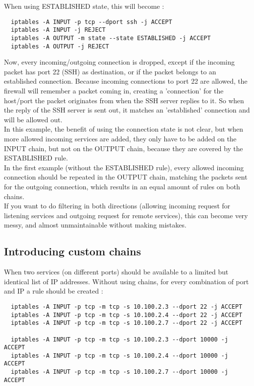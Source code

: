 \documentclass[a4paper,12pt]{article}
\begin{document}
When using ESTABLISHED state, this will become :
\begin{verbatim}
  iptables -A INPUT -p tcp --dport ssh -j ACCEPT
  iptables -A INPUT -j REJECT
  iptables -A OUTPUT -m state --state ESTABLISHED -j ACCEPT
  iptables -A OUTPUT -j REJECT
\end{verbatim}

Now, every incoming/outgoing connection is dropped, except if the incoming packet has port 22 (SSH) as destination, or if the packet belongs to an established connection. Because incoming connections to port 22 are allowed, the firewall will remember a packet coming in, creating a 'connection' for the host/port the packet originates from when the SSH server replies to it. So when the reply of the SSH server is sent out, it matches an 'established' connection and will be allowed out.\\

In this example, the benefit of using the connection state is not clear, but when more allowed incoming services are added, they only have to be added on the INPUT chain, but not on the OUTPUT chain, because they are covered by the ESTABLISHED rule.\\
In the first example (without the ESTABLISHED rule), every allowed incoming connection should be repeated in the OUTPUT chain, matching the packets sent for the outgoing connection, which results in an equal amount of rules on both chains.\\
If you want to do filtering in both directions (allowing incoming request for listening services and outgoing request for remote services), this can become very messy, and almost unmaintainable without making mistakes.\\

\subsection{Introducing custom chains}
When two services (on different ports) should be available to a limited but identical list of IP addresses.
Without using chains, for every combination of port and IP a rule should be created :
\begin{verbatim}
  iptables -A INPUT -p tcp -m tcp -s 10.100.2.3 --dport 22 -j ACCEPT
  iptables -A INPUT -p tcp -m tcp -s 10.100.2.4 --dport 22 -j ACCEPT
  iptables -A INPUT -p tcp -m tcp -s 10.100.2.7 --dport 22 -j ACCEPT

  iptables -A INPUT -p tcp -m tcp -s 10.100.2.3 --dport 10000 -j ACCEPT
  iptables -A INPUT -p tcp -m tcp -s 10.100.2.4 --dport 10000 -j ACCEPT
  iptables -A INPUT -p tcp -m tcp -s 10.100.2.7 --dport 10000 -j ACCEPT
\end{verbatim}
\end{document}
